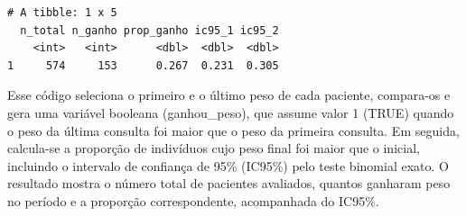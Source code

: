 \documentclass[
]{article}
\newenvironment{Shaded}{\begin{snugshade}}{\end{snugshade}}
\newcommand{\AttributeTok}[1]{\textcolor[rgb]{0.40,0.45,0.13}{#1}}
\newcommand{\CommentTok}[1]{\textcolor[rgb]{0.37,0.37,0.37}{#1}}
\newcommand{\ConstantTok}[1]{\textcolor[rgb]{0.56,0.35,0.01}{#1}}
\newcommand{\FunctionTok}[1]{\textcolor[rgb]{0.28,0.35,0.67}{#1}}
\newcommand{\NormalTok}[1]{\textcolor[rgb]{0.00,0.23,0.31}{#1}}
\newcommand{\OtherTok}[1]{\textcolor[rgb]{0.00,0.23,0.31}{#1}}
\newcommand{\SpecialCharTok}[1]{\textcolor[rgb]{0.37,0.37,0.37}{#1}}
\newcommand{\StringTok}[1]{\textcolor[rgb]{0.13,0.47,0.30}{#1}}
\begin{document}
\begin{Shaded}
\end{Shaded}

\begin{verbatim}
# A tibble: 1 x 5
  n_total n_ganho prop_ganho ic95_1 ic95_2
    <int>   <int>      <dbl>  <dbl>  <dbl>
1     574     153      0.267  0.231  0.305
\end{verbatim}

Esse código seleciona o primeiro e o último peso de cada paciente,
compara-os e gera uma variável booleana (ganhou\_peso), que assume valor
1 (TRUE) quando o peso da última consulta foi maior que o peso da
primeira consulta. Em seguida, calcula-se a proporção de indivíduos cujo
peso final foi maior que o inicial, incluindo o intervalo de confiança
de 95\% (IC95\%) pelo teste binomial exato. O resultado mostra o número
total de pacientes avaliados, quantos ganharam peso no período e a
proporção correspondente, acompanhada do IC95\%.
\end{document}
